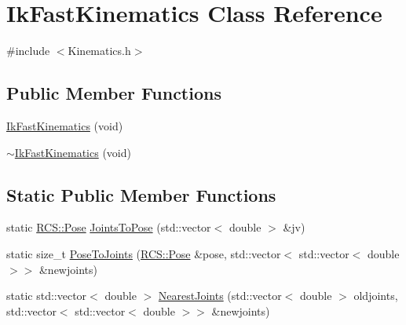 \hypertarget{classIkFastKinematics}{\section{Ik\-Fast\-Kinematics Class Reference}
\label{classIkFastKinematics}
}


{\ttfamily \#include $<$Kinematics.\-h$>$}

\subsection*{Public Member Functions}
\begin{DoxyCompactItemize}
\item 
\hyperlink{classIkFastKinematics_abdcbf43655dd18b38014c8bfb9d54ffa}{Ik\-Fast\-Kinematics} (void)
\item 
\hyperlink{classIkFastKinematics_a3b22db101469c7489081b1ca152d89d0}{$\sim$\-Ik\-Fast\-Kinematics} (void)
\end{DoxyCompactItemize}
\subsection*{Static Public Member Functions}
\begin{DoxyCompactItemize}
\item 
static \hyperlink{namespaceRCS_aa07e45d8a50e30064283d2b38087f999}{R\-C\-S\-::\-Pose} \hyperlink{classIkFastKinematics_a42598ff0c1c798f67edf49c708d239c6}{Joints\-To\-Pose} (std\-::vector$<$ double $>$ \&jv)
\item 
static size\-\_\-t \hyperlink{classIkFastKinematics_af794b1d55922c6ec483e8166e7950a79}{Pose\-To\-Joints} (\hyperlink{namespaceRCS_aa07e45d8a50e30064283d2b38087f999}{R\-C\-S\-::\-Pose} \&pose, std\-::vector$<$ std\-::vector$<$ double $>$$>$ \&newjoints)
\item 
static std\-::vector$<$ double $>$ \hyperlink{classIkFastKinematics_add7f06c8e6b5f1d68820354d4938e2f4}{Nearest\-Joints} (std\-::vector$<$ double $>$ oldjoints, std\-::vector$<$ std\-::vector$<$ double $>$$>$ \&newjoints)
\end{DoxyCompactItemize}


